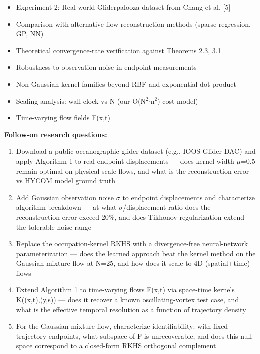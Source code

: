 \begin{itemize}[leftmargin=1.4em,itemsep=0.2em,topsep=0.2em]
\item Experiment 2: Real-world Gliderpalooza dataset from Chang et al. [5]
\item Comparison with alternative flow-reconstruction methods (sparse regression, GP, NN)
\item Theoretical convergence-rate verification against Theorems 2.3, 3.1
\item Robustness to observation noise in endpoint measurements
\item Non-Gaussian kernel families beyond RBF and exponential-dot-product
\item Scaling analysis: wall-clock vs N (our O(N$^2$$\cdot$n$^2$) cost model)
\item Time-varying flow fields F(x,t)
\end{itemize}\noindent\textbf{Follow-on research questions:}
\begin{enumerate}[leftmargin=1.6em,itemsep=0.2em,topsep=0.2em,label=Q\arabic*.]
\item Download a public oceanographic glider dataset (e.g., IOOS Glider DAC) and apply Algorithm 1 to real endpoint displacements --- does kernel width $\mu$=0.5 remain optimal on physical-scale flows, and what is the reconstruction error vs HYCOM model ground truth
\item Add Gaussian observation noise $\sigma$ to endpoint displacements and characterize algorithm breakdown --- at what $\sigma$/displacement ratio does the reconstruction error exceed 20\%, and does Tikhonov regularization extend the tolerable noise range
\item Replace the occupation-kernel RKHS with a divergence-free neural-network parameterization --- does the learned approach beat the kernel method on the Gaussian-mixture flow at N=25, and how does it scale to 4D (spatial+time) flows
\item Extend Algorithm 1 to time-varying flows F(x,t) via space-time kernels K((x,t),(y,s)) --- does it recover a known oscillating-vortex test case, and what is the effective temporal resolution as a function of trajectory density
\item For the Gaussian-mixture flow, characterize identifiability: with fixed trajectory endpoints, what subspace of F is unrecoverable, and does this null space correspond to a closed-form RKHS orthogonal complement
\end{enumerate}

